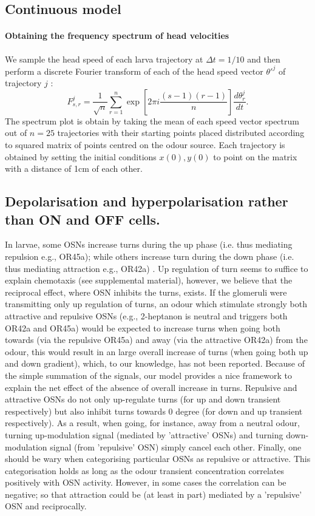 \subsection{Continuous model}



\paragraph{Obtaining the frequency spectrum of head velocities}
We sample the head speed of each larva trajectory at $\Delta t = 1/10$ and then perform a discrete Fourier transform of each of the head speed vector $\theta'^j$ of trajectory $j$ :
\begin{equation}
F_{s,r}^j = \frac{1}{\sqrt{n}} \sum_{r=1}^n \exp{\left[2 \pi i \frac{ (s-1)(r-1)}{n}\right]} \frac{d\theta_r^j}{dt}.
\end{equation}
The spectrum plot is obtain by taking the mean of each speed vector spectrum out of $n=25$ trajectories with their starting points placed distributed according to squared matrix of points centred on the odour source. Each trajectory is obtained by setting the initial conditions $x(0),y(0)$ to point on the matrix with a distance of 1cm of each other.

\subsection{Depolarisation and hyperpolarisation rather than ON and OFF cells.}
In larvae, some OSNs increase turns during the up phase (i.e. thus mediating repulsion e.g., OR45a); while others increase turn during the down phase (i.e. thus mediating attraction e.g., OR42a) \citep{hernandez2015reverse}.
 Up regulation of turn seems to suffice to explain chemotaxis (see supplemental material), however, we believe that the reciprocal effect, where OSN inhibits the turns, exists.
 If the glomeruli were transmitting only up regulation of turns, an odour which stimulate strongly both attractive and repulsive OSNs (e.g., 2-heptanon is neutral and triggers both OR42a and OR45a) would be expected to increase turns when going both towards (via the repulsive OR45a) and away (via the attractive OR42a) from the odour, this would result in an large overall increase of turns (when going both up and down gradient), which, to our knowledge, has not been reported. Because of the simple summation of the signals, our model provides a nice framework to explain the net effect of the absence of overall increase in turns.
 Repulsive and attractive OSNs do not only up-regulate turns (for up and down transient respectively) but also inhibit turns towards 0 degree (for down and up transient respectively). As a result, when going, for instance, away from a neutral odour, turning up-modulation signal (mediated by 'attractive' OSNs) and turning down-modulation signal (from 'repulsive' OSN) simply cancel each other.
  Finally, one should be wary when categorising particular OSNs as repulsive or attractive. This categorisation holds as long as the odour transient concentration correlates positively with OSN activity. However, in some cases the correlation can be negative; so that attraction could be (at least in part) mediated by a 'repulsive' OSN and reciprocally.

